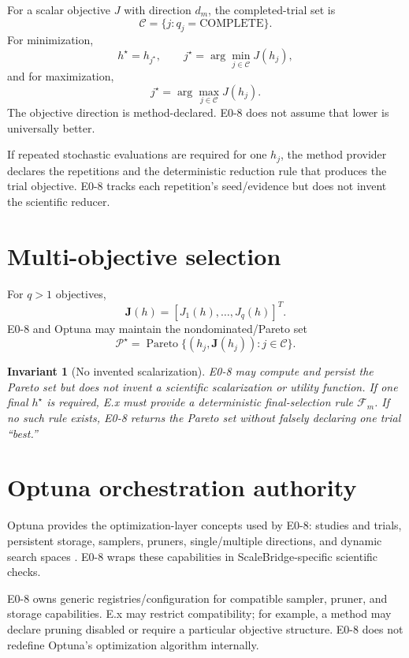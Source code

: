 \documentclass[11pt]{article}
\newtheorem{invariant}{Invariant}
\begin{document}
For a scalar objective $J$ with direction $d_m$, the completed-trial set is
\[
\mathcal C=\{j:q_j=\mathrm{COMPLETE}\}.
\]
For minimization,
\[
\boxed{
h^{\star}=h_{j^{\star}},\qquad
j^{\star}=\arg\min_{j\in\mathcal C}J(h_j),
}
\]
and for maximization,
\[
\boxed{
j^{\star}=\arg\max_{j\in\mathcal C}J(h_j).}
\]
The objective direction is method-declared. E0-8 does not assume that lower is
universally better.

If repeated stochastic evaluations are required for one $h_j$, the method
provider declares the repetitions and the deterministic reduction rule that
produces the trial objective. E0-8 tracks each repetition's seed/evidence but
does not invent the scientific reducer.

\section{Multi-objective selection}

For $q>1$ objectives,
\[
\mathbf J(h)=[J_1(h),\ldots,J_q(h)]^T.
\]
E0-8 and Optuna may maintain the nondominated/Pareto set
\[
\boxed{
\mathcal P^{\star}
=\operatorname{Pareto}\{(h_j,\mathbf J(h_j)):j\in\mathcal C\}.
}
\]

\begin{invariant}[No invented scalarization]
E0-8 may compute and persist the Pareto set but does not invent a scientific
scalarization or utility function. If one final $h^{\star}$ is required, E.x
must provide a deterministic final-selection rule $\mathcal F_m$. If no such
rule exists, E0-8 returns the Pareto set without falsely declaring one trial
``best.''
\end{invariant}

\section{Optuna orchestration authority}

Optuna provides the optimization-layer concepts used by E0-8: studies and
trials, persistent storage, samplers, pruners, single/multiple directions, and
dynamic search spaces \cite{AkibaEtAl2019Optuna,OptunaDocs2026}. E0-8 wraps
these capabilities in ScaleBridge-specific scientific checks.

E0-8 owns generic registries/configuration for compatible sampler, pruner, and
storage capabilities. E.x may restrict compatibility; for example, a method may
declare pruning disabled or require a particular objective structure. E0-8
does not redefine Optuna's optimization algorithm internally.
\end{document}
